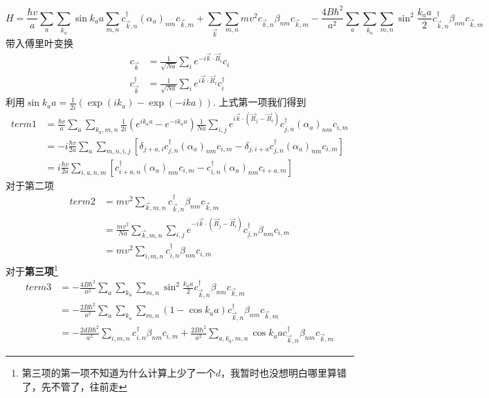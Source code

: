\documentclass{article}
\numberwithin{equation}{subsection}
\begin{document}
\begin{equation}
    H=\frac{\hbar v}{a}\sum_{a}\sum_{k_a}\sin k_aa\sum_{m,n}c_{\vec{k},n}^\dagger(\alpha_a)_{nm}c_{\vec{k},m}+\sum_{\vec{k}}\sum_{m,n}mv^2c_{\vec{k},n}\beta_{nm}c_{\vec{k},m}-\frac{4B\hbar^2}{a^2}\sum_{a}\sum_{k_a}\sum_{m,n}\sin^2 \frac{k_aa}{2}c_{\vec{k},n}^\dagger\beta_{nm}c_{\vec{k},m}
\end{equation}
带入傅里叶变换
\begin{equation}
    \begin{split}
        c_{\vec{k}}&=\frac{1}{\sqrt{Na}}\sum_{i}e^{-i\vec{k}\cdot\vec{R}_i}c_i\\
        c_{\vec{k}}^\dagger&=\frac{1}{\sqrt{Na}}\sum_{i}e^{i\vec{k}\cdot\vec{R}_i}c_i^\dagger
    \end{split}
\end{equation}
利用$\sin k_aa=\frac{1}{2i}(\exp(ik_a)-\exp(-ika))$. 上式第一项我们得到
\begin{equation}
    \begin{split}
        term 1&=\frac{\hbar v}{a}\sum_{a}\sum_{k_a,m,n}\frac{1}{2i}(e^{ik_aa}-e^{-ik_aa})\frac{1}{Na}\sum_{i,j}e^{i\vec{k}\cdot(\vec{R}_j-\vec{R}_i)}c_{j,n}^\dagger(\alpha_a)_{nm}c_{i,m}\\
        &=-i\frac{\hbar v}{2a}\sum_{a}\sum_{m,n,i,j}[\delta_{j+a,i}c_{j,n}^\dagger(\alpha_a)_{nm}c_{i,m}-\delta_{j,i+a}c_{j,n}^\dagger(\alpha_a)_{nm}c_{i,m}]\\
        &=i\frac{\hbar v}{2a}\sum_{i,a,n,m}[c_{i+a,n}^\dagger(\alpha_a)_{nm}c_{i,m}-c_{i,n}^\dagger(\alpha_a)_{nm}c_{i+a,m}]
    \end{split}
\end{equation}
对于第二项
\begin{equation}
    \begin{split}
        term2&=mv^2\sum_{\vec{k},m,n}c_{\vec{k},n}^\dagger\beta_{nm}c_{\vec{k},m}\\
        &=\frac{mv^2}{Na}\sum_{\vec{k},m,n}\sum_{i,j}e^{-i\vec{k}\cdot(\vec{R}_j-\vec{R}_{i})}c_{j,n}^\dagger\beta_{nm}c_{i,m}\\
        &=mv^2\sum_{i,m,n}c_{i,n}^\dagger\beta_{nm}c_{i,m}
    \end{split}
\end{equation}
对于\textbf{\textcolor[rgb]{1,0,0}{第三项}}\footnote{第三项的第一项不知道为什么计算上少了一个$d$，我暂时也没想明白哪里算错了，先不管了，往前走}
\begin{equation}
    \begin{split}
        term3&=-\frac{4B\hbar^2}{a^2}\sum_{a}\sum_{k_a}\sum_{m,n}\sin^2\frac{k_aa}{2}c_{\vec{k},n}^\dagger\beta_{nm}c_{\vec{k},m}\\
        &=-\frac{2B\hbar^2}{a^2}\sum_{a}\sum_{k_a}\sum_{m,n}(1-\cos k_aa)c_{\vec{k},n}^\dagger\beta_{nm}c_{\vec{k},m}\\
        &=-\frac{2dB\hbar^2}{a^2}\sum_{i,m,n}c_{i,n}^\dagger\beta_{nm}c_{i,m}+\frac{2B\hbar^2}{a^2}\sum_{a,k_a,m,n}\cos k_aac_{\vec{k},n}^\dagger\beta_{nm}c_{\vec{k},m}
    \end{split}
\end{equation}
\end{document}
